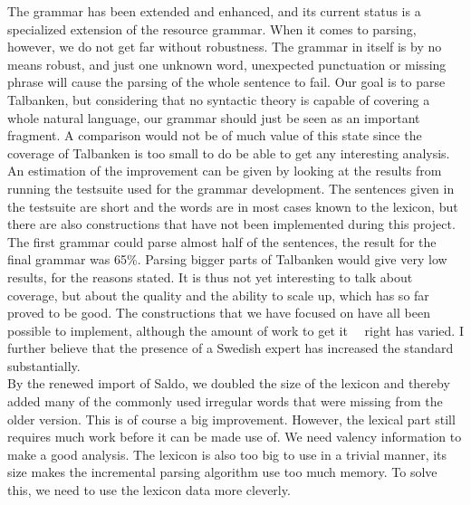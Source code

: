 \documentclass{report}
\begin{document}
The grammar has been extended and enhanced, and its current status is
a specialized extension of the resource grammar. When it comes to parsing,
however, we do not get far without robustness.
The grammar in itself is by no means robust, and just one unknown word,
unexpected punctuation
or missing phrase will cause the parsing of the whole sentence to fail. 
Our goal is to parse Talbanken, but considering that no syntactic theory is capable
of covering a whole natural language, our grammar should just be seen as an important
fragment.
A comparison would not be of much value of this state since the coverage of Talbanken
is too small to do be able to get any interesting analysis.\\

An estimation of the improvement can be given by looking at the results from
running the testsuite used for the grammar development.
The sentences given in the testsuite are short and the words are in most cases known
to the lexicon, but there are also constructions that have not been implemented 
during this project.
The first grammar could parse almost half of the sentences, the result for the final
grammar was 65\%. 
Parsing bigger parts of Talbanken would give very low results, for the reasons stated.
It is thus not yet interesting to talk about coverage, but about the quality and
the ability to scale up, which has so far proved to be good. The constructions
that we have focused on have all been possible to implement, although the amount
of work to get it ~~right has varied.
I further believe that the presence of a Swedish expert has
increased the standard substantially.\\


By the renewed import of Saldo, we doubled the size of the lexicon and thereby
added many of the commonly used irregular words that were missing from the older
version. This is of course a big improvement.
However, the lexical part still requires much work before it can be made use of.
We need valency information to make a good analysis. The lexicon is also too
big to use in a trivial manner, its size makes the incremental parsing algorithm
use too much memory. To solve this, we need to use the lexicon data more cleverly.

%
%
\end{document}
